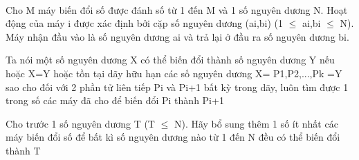  

Cho M máy biến đổi số được đánh số từ 1 đến M và 1 số nguyên dương N. Hoạt động của máy i được xác định bởi cặp số nguyên dương (ai,bi) (1 $\le$ ai,bi $\le$ N). Máy nhận đầu vào là số nguyên dương ai và trả lại ở đầu ra số nguyên dương bi.

Ta nói một số nguyên dương X có thể biến đổi thành số nguyên dương Y nếu hoặc X=Y hoặc tồn tại dãy hữu hạn các số nguyên dương X= P1,P2,...,Pk =Y sao cho đối với 2 phần tử liên tiếp Pi và Pi+1 bất kỳ trong dãy, luôn tìm được 1 trong số các máy đã cho để biến đổi Pi thành Pi+1

Cho trước 1 số nguyên dương T (T  $\le$  N). Hãy bổ sung thêm 1 số ít nhất các máy biến đổi số để bất kì số nguyên dương nào từ 1 đến N đều có thể biến đổi thành T